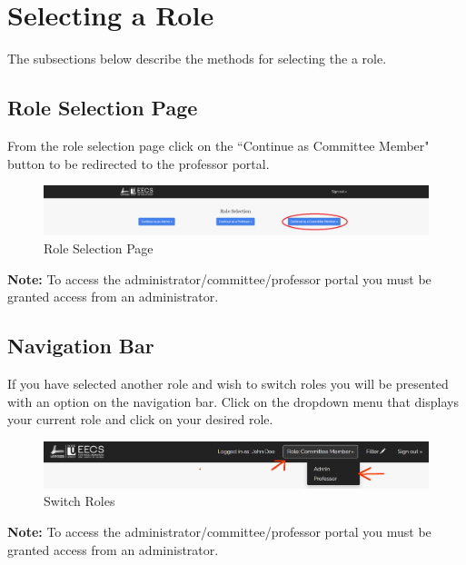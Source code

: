 \documentclass[fontsize=12pt,paper=letter,twoside]{scrartcl}
\begin{document}
\clearpage

\section{Selecting a Role}
The subsections below describe the methods for selecting the a role.

\subsection{Role Selection Page}
From the role selection page click on the ``Continue as Committee Member" button to be redirected to the professor portal.

\begin{figure}[!htb]
\begin{center}
\includegraphics[width=.99\textwidth]{images/auth.png}
\end{center}
\caption{Role Selection Page}
\label{fig:role_selection1}
\end{figure}

\noindent \textbf{Note:} To access the administrator/committee/professor portal you must be granted access from an administrator.

\subsection{Navigation Bar}
If you have selected another role and wish to switch roles you will be presented with an option on the navigation bar. Click on the dropdown menu that displays your current role and click on your desired role.
\begin{figure}[!htb]
\begin{center}
\includegraphics[width=.99\textwidth]{images/role-selection2.png}
\end{center}
\caption{Switch Roles}
\label{fig:role_selection2}
\end{figure}

\noindent \textbf{Note:} To access the administrator/committee/professor portal you must be granted access from an administrator.
\end{document}
